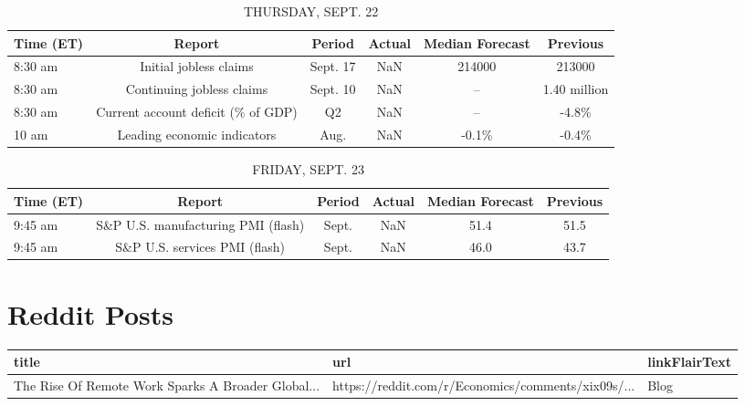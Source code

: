 \documentclass{article}%
\begin{document}
%


\begin{table}[htbp]%
\caption{THURSDAY, SEPT. 22}%
\centering%
\begin{adjustbox}{width=1\textwidth}%
\begin{tabular}{lccccc}
\toprule
Time (ET) &                             Report &   Period & Actual & Median Forecast &     Previous \\
\midrule
  8:30 am &             Initial jobless claims & Sept. 17 &    NaN &          214000 &       213000 \\
  8:30 am &          Continuing jobless claims & Sept. 10 &    NaN &              -- & 1.40 million \\
  8:30 am & Current account deficit (\% of GDP) &       Q2 &    NaN &              -- &        -4.8\% \\
    10 am &        Leading economic indicators &     Aug. &    NaN &           -0.1\% &        -0.4\% \\
\bottomrule
\end{tabular}
%
\end{adjustbox}%
\end{table}

%


\begin{table}[htbp]%
\caption{FRIDAY, SEPT. 23}%
\centering%
\begin{adjustbox}{width=1\textwidth}%
\begin{tabular}{lccccc}
\toprule
Time (ET) &                             Report & Period & Actual & Median Forecast & Previous \\
\midrule
  9:45 am & S\&P U.S. manufacturing PMI (flash) &  Sept. &    NaN &            51.4 &     51.5 \\
  9:45 am &      S\&P U.S. services PMI (flash) &  Sept. &    NaN &            46.0 &     43.7 \\
\bottomrule
\end{tabular}
%
\end{adjustbox}%
\end{table}

%
\section{Reddit Posts}%
\label{sec:RedditPosts}%


\begin{table}[htbp]%
\centering%
\begin{adjustbox}{width=1\textwidth}%
\begin{tabular}{lll}
\toprule
                                             title &                                                url & linkFlairText \\
\midrule
The Rise Of Remote Work Sparks A Broader Global... & https://reddit.com/r/Economics/comments/xix09s/... &          Blog \\
\bottomrule
\end{tabular}
%
\end{adjustbox}%
\end{table}

%
\end{document}
